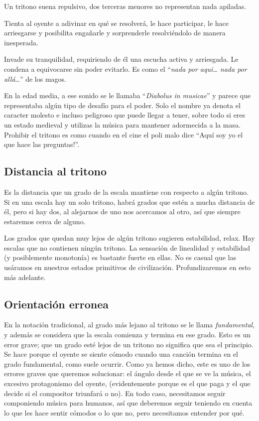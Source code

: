 \documentclass[]{article}
\begin{document}
Un tritono suena repulsivo, dos terceras menores no representan nada apiladas.

Tienta al oyente a adivinar en qué se resolverá, le hace participar, le hace arriesgarse y posibilita engañarle y sorprenderle resolviéndolo de manera inesperada.

Invade su tranquilidad, requiriendo de él una escucha activa y arriesgada. Le condena a equivocarse sin poder evitarlo. Es como el ``\emph{nada por aqui\ldots{}   nada por allá}\ldots{}'' de los magos.

En la edad media, a ese sonido se le llamaba ``\emph{Diabolus in musicae}'' y parece que representaba algún tipo de desafío para el poder. Solo el nombre ya denota el caracter molesto e incluso peligroso que puede llegar a tener, sobre todo si eres un estado medieval y utilizas la música para mantener adormecida a la masa. Prohibir el tritono es como cuando en el cine el poli malo dice ``Aquí soy yo el que hace las preguntas!''.

\subsection{Distancia al tritono}

Es la distancia que un grado de la escala mantiene con respecto a algún tritono. Si en una escala hay un solo tritono, habrá grados que estén a mucha distancia de él, pero si hay dos, al alejarnos de uno nos acercamos al otro, así que siempre estaremos cerca de alguno.

Los grados que quedan muy lejos de algún tritono sugieren estabilidad, relax. Hay escalas que no contienen ningún tritono. La sensación de linealidad y estabilidad (y posiblemente monotonía) es bastante fuerte en ellas. No es casual que las usáramos en nuestros estados primitivos de civilización. Profundizaremos en esto más adelante.

\subsection{Orientación erronea}

En la notación tradicional, al grado más lejano al tritono se le llama \emph{fundamental}, y además se considera que la escala comienza y termina en ese grado. Esto es un error grave; que un grado esté lejos de un tritono no significa que sea el principio. Se hace porque el oyente se siente cómodo cuando una canción termina en el grado fundamental, como suele ocurrir. Como ya hemos dicho, este es uno de los errores graves que queremos solucionar: el ángulo desde el que se ve la música, el excesivo protagonismo del oyente, (evidentemente porque es el que paga y el que decide si el compositor triunfará o no). En todo caso, necesitamos seguir componiendo música para humanos, así que deberemos seguir teniendo en cuenta lo que les hace sentir cómodos o lo que no, pero necesitamos entender por qué.
\end{document}
